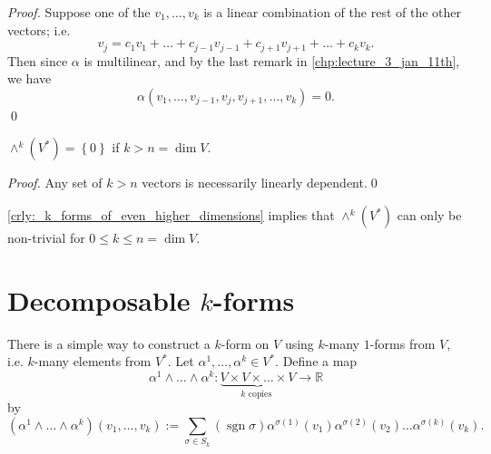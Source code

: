 \documentclass[notoc,notitlepage]{tufte-book}
\DeclareMathOperator{\sgn}{sgn}
\begin{document}
\begin{proof}
  Suppose one of the $v_1, \ldots, v_k$ is a linear combination of the rest of the
  other vectors; i.e.
  \begin{equation*}
    v_j = c_1 v_1 + \hdots + c_{j - 1} v_{j - 1} + c_{j + 1} v_{j + 1} + \hdots + c_k v_k.
  \end{equation*}
  Then since $\alpha$ is multilinear, and by the last remark in \cref{chp:lecture_3_jan_11th},
  we have
  \begin{equation*}
    \alpha (v_1, \ldots, v_{j - 1}, v_j , v_{j + 1}, \ldots, v_k) = 0.
  \end{equation*}\qed\
\end{proof}

\begin{crly}\label{crly:_k_forms_of_even_higher_dimensions}
  $\wedge^k \left( V^* \right) = \left\{ 0 \right\}$ if $k > n = \dim V$.
\end{crly}

\begin{proof}
  Any set of $k > n$ vectors is necessarily linearly dependent.\qed\
\end{proof}

\begin{note}
  \cref{crly:_k_forms_of_even_higher_dimensions} implies that $\wedge^k \left( V^* \right)$
  can only be non-trivial for $0 \leq k \leq n = \dim V$.
\end{note}


\section{Decomposable \texorpdfstring{$k$}{k}-forms}%
\label{sec:decomposable_k_forms}

There is a simple way to construct a $k$-form on $V$ using $k$-many $1$-forms from $V$, i.e.
$k$-many elements from $V^*$. Let $\alpha^1, \ldots, \alpha^k \in V^*$. Define a map
\begin{equation*}
  \alpha^1 \land \hdots \land \alpha^k : \underbrace{V \times V \times \hdots \times V}_{k \text{ copies }} \to \mathbb{R}
\end{equation*}
by
\begin{equation}\label{eq:defining_a_k_form}
  \left( \alpha^1 \land \hdots \land \alpha^k \right) ( v_1, \ldots, v_k )
  := \sum_{\sigma \in S_k} \left( \sgn \sigma \right) \alpha^{\sigma(1)}(v_1) \alpha^{\sigma(2)}(v_2) \hdots \alpha^{\sigma(k)}(v_k).
\end{equation}
\end{document}
